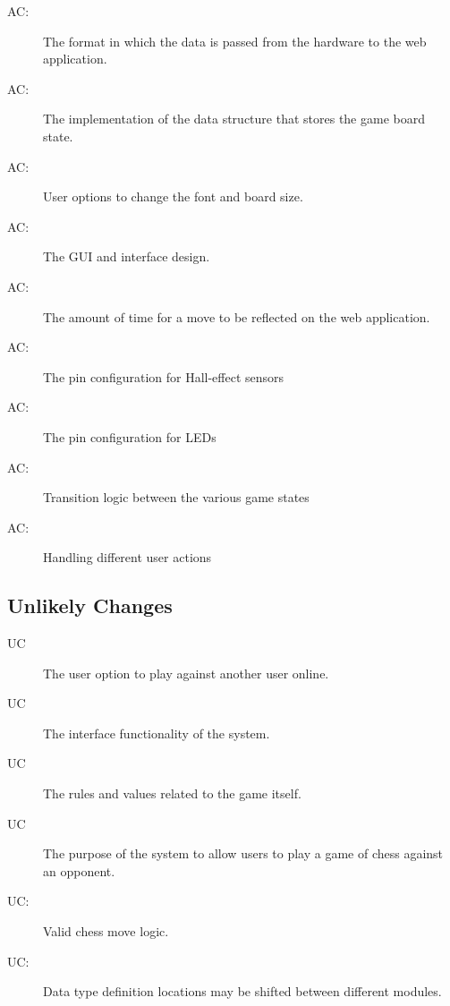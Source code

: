 \documentclass[12pt, titlepage]{article}
\newcounter{acnum}
\newcommand{\actheacnum}{AC\theacnum}
\newcounter{ucnum}
\newcommand{\uctheucnum}{UC\theucnum}
\begin{document}
\begin{description}
  \item[ \actheacnum \label{acVerification}:] The format in which the data is passed from the hardware to the web application.
  \item[ \actheacnum \label{acBoardState}:] The implementation of the data structure that stores the game board state.
  \item[ \actheacnum \label{acFontAndPieces}:] User options to change the font and board size.
  \item[ \actheacnum \label{acGUI}:] The GUI and interface design.
  \item[ \actheacnum \label{acTimers}:] The amount of time for a move to be reflected on the web application.
\item[ \actheacnum \label{acHES}:] The pin configuration for Hall-effect sensors
\item[ \actheacnum \label{acLED}:] The pin configuration for LEDs
\item[ \actheacnum \label{acTGS}:] Transition logic between the various game states
\item[ \actheacnum \label{acHUA}:] Handling different user actions
\end{description}

\subsection{Unlikely Changes} \label{SecUchange}

\begin{description}
  \item[ \uctheucnum] The user option to play against another user online.
  \item[ \uctheucnum] The interface functionality of the system.
  \item[ \uctheucnum] The rules and values related to the game itself.
  \item[ \uctheucnum] The purpose of the system to allow users to play a game of chess against an opponent.
\item[ \uctheucnum \label{ucVML}:] Valid chess move logic.
\item[ \uctheucnum \label{ucDTD}:] Data type definition locations may be shifted between different modules.
\end{description}
\end{document}
